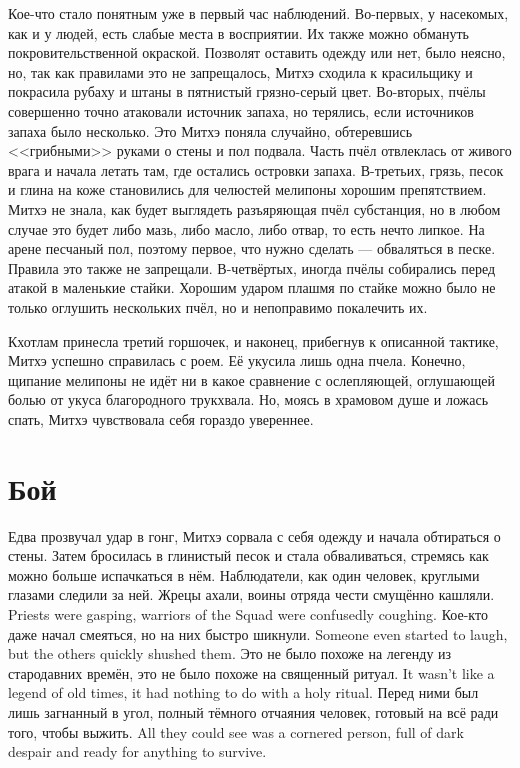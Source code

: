 Кое-что стало понятным уже в первый час наблюдений.
Во-первых, у насекомых, как и у людей, есть слабые места в восприятии.
Их также можно обмануть покровительственной окраской.
Позволят оставить одежду или нет, было неясно, но, так как правилами это не запрещалось, Митхэ сходила к красильщику и покрасила рубаху и штаны в пятнистый грязно-серый цвет.
Во-вторых, пчёлы совершенно точно атаковали источник запаха, но терялись, если источников запаха было несколько.
Это Митхэ поняла случайно, обтеревшись <<грибными>> руками о стены и пол подвала.
Часть пчёл отвлеклась от живого врага и начала летать там, где остались островки запаха.
В-третьих, грязь, песок и глина на коже становились для челюстей мелипоны хорошим препятствием.
Митхэ не знала, как будет выглядеть разъяряющая пчёл субстанция, но в любом случае это будет либо мазь, либо масло, либо отвар, то есть нечто липкое.
На арене песчаный пол, поэтому первое, что нужно сделать --- обваляться в песке.
Правила это также не запрещали.
В-четвёртых, иногда пчёлы собирались перед атакой в маленькие стайки.
Хорошим ударом плашмя по стайке можно было не только оглушить нескольких пчёл, но и непоправимо покалечить их.

Кхотлам принесла третий горшочек, и наконец, прибегнув к описанной тактике, Митхэ успешно справилась с роем.
Её укусила лишь одна пчела.
Конечно, щипание мелипоны не идёт ни в какое сравнение с ослепляющей, оглушающей болью от укуса благородного трукхвала.
Но, моясь в храмовом душе и ложась спать, Митхэ чувствовала себя гораздо увереннее.

\section{Бой}

Едва прозвучал удар в гонг, Митхэ сорвала с себя одежду и начала обтираться о стены.
Затем бросилась в глинистый песок и стала обваливаться, стремясь как можно больше испачкаться в нём.
Наблюдатели, как один человек, круглыми глазами следили за ней.
{Жрецы ахали, воины отряда чести смущённо кашляли.}
{Priests were gasping, warriors of the Squad were confusedly coughing.}
{Кое-кто даже начал смеяться, но на них быстро шикнули.}
{Someone even started to laugh, but the others quickly shushed them.}
{Это не было похоже на легенду из стародавних времён, это не было похоже на священный ритуал.}
{It wasn't like a legend of old times, it had nothing to do with a holy ritual.}
{Перед ними был лишь загнанный в угол, полный тёмного отчаяния человек, готовый на всё ради того, чтобы выжить.}
{All they could see was a cornered person, full of dark despair and ready for anything to survive.}

